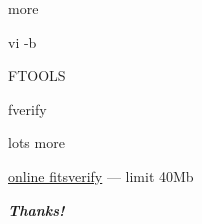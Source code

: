 \documentclass[20pt,landscape]{foils}
\newif\ifrubric
\newcommand{\bhref}[2]{\href{#1}{{\color{blue}#2}}}
\begin{document}

\begin{list2}
  \item more
  \item vi -b
  \item FTOOLS
  \begin{list3}
    \item fverify
    \item lots more
  \end{list3}
  \item \bhref{https://fits.gsfc.nasa.gov/fits_verify.html}{online fitsverify}
        --- limit 40Mb
\end{list2}


\vspace{0.2cm}
\begin{center}
  {\color{darkred}\Huge\bf\sl Thanks!}
\end{center}

\label{lastPage}

\ifrubric

\newcommand{\aobSlide}[1]{
\newpage
\rightfooter{}
\MyLogo{}
\begin{picture}(30,0)
  #1
\end{picture}
\bigword{AOB?}
}
\aobSlide{}

\fi
\end{document}
